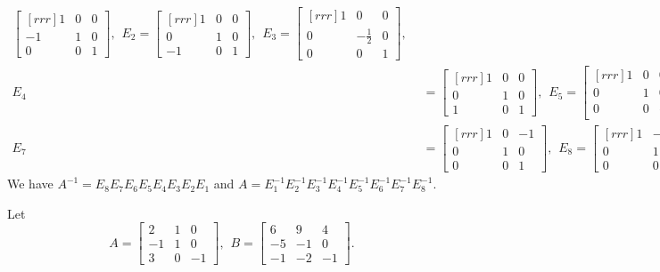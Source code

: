 \begin{solution}
\begin{align*}
\begin{bmatrix}[rrr]
1&0&0\\
-1&1&0\\
0&0&1
\end{bmatrix}, \hspace{5pt}
E_2=\begin{bmatrix}[rrr]
1&0&0\\
0&1&0\\
-1&0&1
\end{bmatrix}, \hspace{5pt}
E_3=\begin{bmatrix}[rrr]
1&0&0\\
0&-\frac{1}{2}&0\\
0&0&1
\end{bmatrix}, \hspace{5pt}
\\
E_4&=\begin{bmatrix}[rrr]
1&0&0\\
0&1&0\\
1&0&1
\end{bmatrix}, \hspace{5pt}
E_5=\begin{bmatrix}[rrr]
1&0&0\\
0&1&0\\
0&0&-\frac{2}{3}
\end{bmatrix}, \hspace{5pt}
E_6=\begin{bmatrix}[rrr]
1&0&0\\
0&1&-\frac{1}{2}\\
0&0&1
\end{bmatrix}, \hspace{5pt}
\\
E_7&=\begin{bmatrix}[rrr]
1&0&-1\\
0&1&0\\
0&0&1
\end{bmatrix}, \hspace{5pt}
E_8=\begin{bmatrix}[rrr]
1&-1&0\\
0&1&0\\
0&0&1
\end{bmatrix}, \hspace{5pt}
\end{align*}
We have $A^{-1}=E_8E_7E_6E_5E_4E_3E_2E_1$ and $A=E_1^{-1}E_2^{-1}E_3^{-1}E_4^{-1}E_5^{-1}E_6^{-1}E_7^{-1}E_8^{-1}$.
\end{solution}
\ii Let
\[
A=\begin{bmatrix}
2&1&0\\
-1&1&0\\
3&0&-1
\end{bmatrix}, \hspace{5pt}
B=\begin{bmatrix}
6&9&4\\
-5&-1&0\\
-1&-2&-1
\end{bmatrix}.
\]
